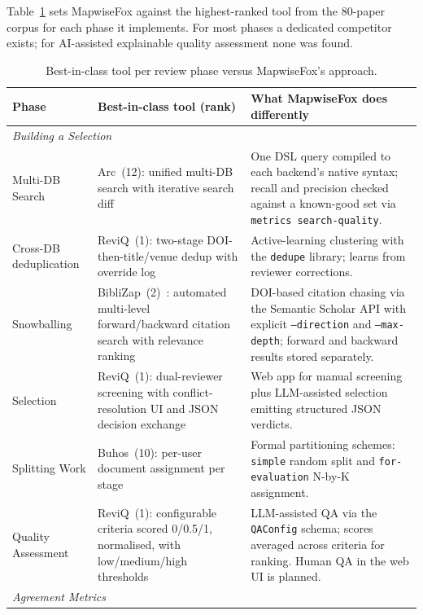 \documentclass[preprint,12pt, a4paper]{elsarticle}
\begin{document}
Table~\ref{tab:bestinclass} sets MapwiseFox against the highest-ranked tool
from the 80-paper corpus for each phase it implements. For most phases a
dedicated competitor exists; for AI-assisted explainable quality assessment
none was found.

\begin{table}[!ht]
  \centering
  \caption{Best-in-class tool per review phase versus MapwiseFox's approach.}
  \label{tab:bestinclass}
  \small
  \setlength{\tabcolsep}{3pt}
  \begin{tabular}{p{}p{}p{}}
    \hline
    Phase & Best-in-class tool (rank) & What MapwiseFox does differently \\
    \hline
    \multicolumn{3}{l}{\textit{Building a Selection}} \\
    Multi-DB Search & Arc~(12): unified multi-DB search with iterative
    search diff & One DSL query compiled to each backend's native syntax;
    recall and precision checked against a known-good set via
    \texttt{metrics search-quality}. \\
    Cross-DB deduplication & ReviQ~(1): two-stage DOI-then-title/venue dedup
    with override log & Active-learning clustering with the \texttt{dedupe}
    library; learns from reviewer corrections. \\
    Snowballing & BibliZap~(2)~\cite{biblizap2026}: automated multi-level
    forward/backward
    citation search with relevance ranking & DOI-based citation chasing via
    the Semantic Scholar API with explicit \texttt{--direction} and
    \texttt{--max-depth}; forward and backward results stored separately. \\
    Selection & ReviQ~(1): dual-reviewer screening with conflict-resolution
    UI and JSON decision exchange & Web app for manual screening plus
    LLM-assisted selection emitting structured JSON verdicts. \\
    Splitting Work & Buhos~(10): per-user document assignment per stage &
    Formal partitioning schemes: \texttt{simple} random split and
    \texttt{for-evaluation} N-by-K assignment. \\
    Quality Assessment & ReviQ~(1): configurable criteria scored 0/0.5/1,
    normalised, with low/medium/high thresholds & LLM-assisted QA via the
    \texttt{QAConfig} schema; scores averaged across criteria for ranking.
    Human QA in the web UI is planned. \\
    \multicolumn{3}{l}{\textit{Agreement Metrics}} \\

\end{tabular}
\end{table}
\end{document}
